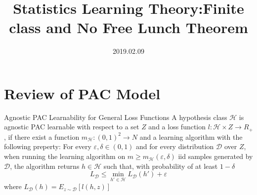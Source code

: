 \documentclass{beamer}
\title[Introduction]{Statistics Learning Theory:Finite class and No Free Lunch Theorem}
\author{}
\institute{}
\date{2019.02.09}
\begin{document}
\begin{frame}
  \titlepage
\end{frame}


\section{Review of PAC Model}
\begin{frame}{Agnostic PAC Learnability for General Loss Functions}
	A hypothesis class $\mathcal{H}$ is agnostic PAC learnable with respect to a set $Z$ and a loss function $l: \mathcal{H} \times Z \rightarrow R_+$, if there exist a function $m_{\mathcal{H}}:(0,1)^2 \rightarrow N$ and a learning algorithm with the following preperty: For every $\varepsilon,\delta \in (0,1)$ and for every distribution $\mathcal{D}$ over $Z$, when running the learning algorithm on $m \geq m_{\mathcal{H}} (\varepsilon,\delta)$ iid samples generated by $\mathcal{D}$, the algorithm returns $h \in \mathcal{H}$ such that, with probability of at least $1- \delta$
	\[L_{\mathcal{D}} \leq \min_{h' \in \mathcal{H}} L_{\mathcal{D}} (h') + \varepsilon\]
	where $L_{\mathcal{D}}(h) = E_{z \sim \mathcal{D}} [l(h,z)]$
\end{frame}
\end{document}
